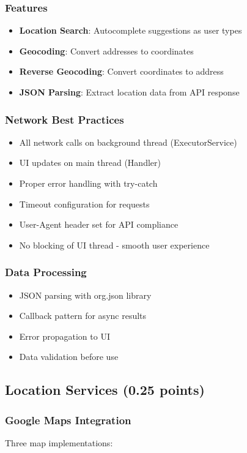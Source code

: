 \documentclass[12pt,a4paper]{article}
\begin{document}
\subsubsection{Features}
\begin{itemize}
    \item \textbf{Location Search}: Autocomplete suggestions as user types
    \item \textbf{Geocoding}: Convert addresses to coordinates
    \item \textbf{Reverse Geocoding}: Convert coordinates to address
    \item \textbf{JSON Parsing}: Extract location data from API response
\end{itemize}

\subsubsection{Network Best Practices}
\begin{itemize}
    \item All network calls on background thread (ExecutorService)
    \item UI updates on main thread (Handler)
    \item Proper error handling with try-catch
    \item Timeout configuration for requests
    \item User-Agent header set for API compliance
    \item No blocking of UI thread - smooth user experience
\end{itemize}

\subsubsection{Data Processing}
\begin{itemize}
    \item JSON parsing with org.json library
    \item Callback pattern for async results
    \item Error propagation to UI
    \item Data validation before use
\end{itemize}

\subsection{Location Services (0.25 points)}

\subsubsection{Google Maps Integration}
Three map implementations:
\end{document}
